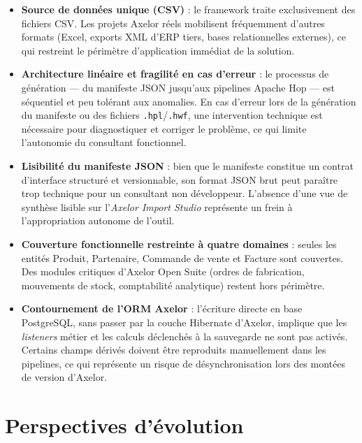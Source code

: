 \begin{itemize}
  \item \textbf{Source de données unique (CSV)} : le framework traite exclusivement des fichiers CSV. Les projets Axelor réels mobilisent fréquemment d'autres formats (Excel, exports XML d'ERP tiers, bases relationnelles externes), ce qui restreint le périmètre d'application immédiat de la solution.

  \item \textbf{Architecture linéaire et fragilité en cas d'erreur} : le processus de génération — du manifeste JSON jusqu'aux pipelines Apache Hop — est séquentiel et peu tolérant aux anomalies. En cas d'erreur lors de la génération du manifeste ou des fichiers \texttt{.hpl}/\texttt{.hwf}, une intervention technique est nécessaire pour diagnostiquer et corriger le problème, ce qui limite l'autonomie du consultant fonctionnel.

  \item \textbf{Lisibilité du manifeste JSON} : bien que le manifeste constitue un contrat d'interface structuré et versionnable, son format JSON brut peut paraître trop technique pour un consultant non développeur. L'absence d'une vue de synthèse lisible sur l'\textit{Axelor Import Studio} représente un frein à l'appropriation autonome de l'outil.

  \item \textbf{Couverture fonctionnelle restreinte à quatre domaines} : seules les entités Produit, Partenaire, Commande de vente et Facture sont couvertes. Des modules critiques d'Axelor Open Suite (ordres de fabrication, mouvements de stock, comptabilité analytique) restent hors périmètre.

  \item \textbf{Contournement de l'ORM Axelor} : l'écriture directe en base PostgreSQL, sans passer par la couche Hibernate d'Axelor, implique que les \textit{listeners} métier et les calculs déclenchés à la sauvegarde ne sont pas activés. Certains champs dérivés doivent être reproduits manuellement dans les pipelines, ce qui représente un risque de désynchronisation lors des montées de version d'Axelor.
\end{itemize}

\section*{Perspectives d'évolution}

